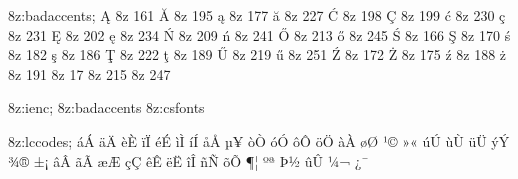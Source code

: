 
\modifydef 8z:badaccents; {%
   \accentdel  \k A      8z  161
   \accentdel  \u A      8z  195
   \accentdel  \k a      8z  177
   \accentdel  \u a      8z  227
   \accentdel  \' C      8z  198
   \accentdel  \c C      8z  199
   \accentdel  \' c      8z  230
   \accentdel  \c c      8z  231
   \accentdel  \k E      8z  202
   \accentdel  \k e      8z  234
   \accentdel  \' N      8z  209
   \accentdel  \' n      8z  241
   \accentdel  \H O      8z  213
   \accentdel  \H o      8z  245
   \accentdel  \' S      8z  166
   \accentdel  \c S      8z  170
   \accentdel  \' s      8z  182
   \accentdel  \c s      8z  186
   \accentdel  \c T      8z  222
   \accentdel  \c t      8z  189
   \accentdel  \H U      8z  219
   \accentdel  \H u      8z  251
   \accentdel  \' Z      8z  172
   \accentdel  \. Z      8z  175
   \accentdel  \' z      8z  188
   \accentdel  \. z      8z  191
   \characterdel \dotelssj   8z  17
   \characterdel \texttimes  8z  215
   \characterdel \textdiv    8z  247
}   


\modifydef 8z:ienc; {%
   \skipfirststep
   \csname 8z:badaccents\endcsname
   \csname 8z:csfonts\endcsname
}

\modifydef 8z:lccodes; {%
   \skipfirststep
   \lccodes ^^e1^^c1%
   \lccodes ^^e4^^c4%
   \lccodes ^^e8^^c8%
   \lccodes ^^ef^^cf%
   \lccodes ^^e9^^c9%
   \lccodes ^^ec^^cc%
   \lccodes ^^ed^^cd%
   \lccodes ^^e5^^c5%
   \lccodes ^^b5^^a5%
   \lccodes ^^f2^^d2%
   \lccodes ^^f3^^d3%
   \lccodes ^^f4^^d4%
   \lccodes ^^f6^^d6%
   \lccodes ^^e0^^c0%
   \lccodes ^^f8^^d8%
   \lccodes ^^b9^^a9%
   \lccodes ^^bb^^ab%
   \lccodes ^^fa^^da%
   \lccodes ^^f9^^d9%
   \lccodes ^^fc^^dc%
   \lccodes ^^fd^^dd%
   \lccodes ^^be^^ae%
   \lccodes ^^b1^^a1%
   \lccodes ^^e2^^c2%
   \lccodes ^^e3^^c3%
   \lccodes ^^e6^^c6%
   \lccodes ^^e7^^c7%
   \lccodes ^^ea^^ca%
   \lccodes ^^eb^^cb%
   \lccodes ^^ee^^ce%
   \lccodes ^^f1^^d1%
   \lccodes ^^f5^^d5%
   \lccodes ^^b6^^a6%
   \lccodes ^^ba^^aa%
   \lccodes ^^de^^bd%
   \lccodes ^^fb^^db%
   \lccodes ^^bc^^ac%
   \lccodes ^^bf^^af%
   \def\lccodesback {\zerolccodes^^80^^ff}%
}

\endinput %


\def\doubleuv#1{\clqq#1\crqq}
\def\doublefuv#1{\frqq#1\flqq}
\def\doubleauv#1{\elqq#1\erqq}
\def\singleauv#1{\elq#1\erq}
\let\uv=\doubleuv  
\let\fuv=\doublefuv
\let\auv=\doubleauv

